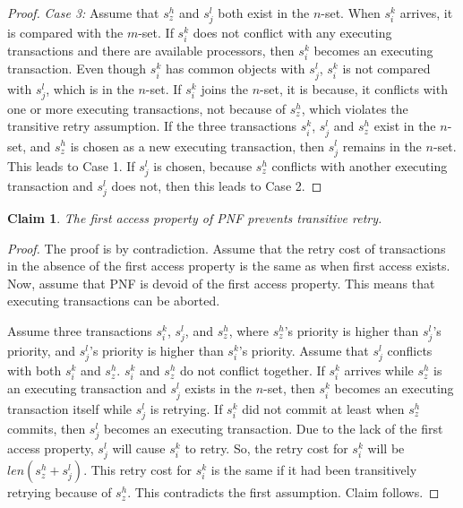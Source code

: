 \documentclass[a4paper,english]{article}
\newtheorem{clm}{Claim}
\newtheorem{proof}{Proof}
\begin{document}
\begin{proof}
\textit{Case 3:} Assume that $s_{z}^{h}$ and $s_{j}^{l}$ both exist in the $n$-set.
When $s_{i}^{k}$ arrives, it is compared with the $m$-set. If $s_{i}^{k}$ does not conflict with any executing transactions and there are available processors, then $s_{i}^{k}$ becomes an executing transaction. 
Even though $s_{i}^{k}$ has common objects with $s_{j}^{l}$, $s_{i}^{k}$ is not compared with $s_{j}^{l}$, which is in the $n$-set. If $s_{i}^{k}$ joins the $n$-set, it is because, it conflicts with one or more executing transactions, not because of $s_{z}^{h}$, which violates the transitive retry assumption.
If the three transactions $s_i^k$, $s_j^l$ and $s_z^h$ exist in the $n$-set, and  $s_{z}^{h}$ is chosen as a new executing transaction, then $s_{j}^{l}$ remains in the $n$-set. This leads to
Case 1. If $s_{j}^{l}$ is chosen, because $s_{z}^{h}$ conflicts
with another executing transaction and $s_{j}^{l}$ does not, then
this leads to Case 2. 
%
\end{proof}


\begin{clm}\label{first-access}
The first access property of PNF prevents transitive retry.
\end{clm}
\begin{proof}\normalfont
The proof is by contradiction. Assume that the retry cost of transactions
in the absence of the first access property is the same as when first access  exists. Now, assume that PNF is devoid of the first access property.  This means that executing transactions can be aborted. 

Assume three transactions $s_{i}^{k}$, $s_{j}^{l}$, and $s_{z}^{h}$, where $s_{z}^{h}$'s priority is higher than $s_{j}^{l}$'s priority, and $s_j^l$'s priority is higher than $s_{i}^{k}$'s priority. Assume that $s_{j}^{l}$ conflicts with both $s_{i}^{k}$ and $s_{z}^{h}$. 
$s_{i}^{k}$ and $s_{z}^{h}$ do not conflict together. If $s_{i}^{k}$
arrives while $s_{z}^{h}$ is an executing transaction and $s_{j}^{l}$
exists in the $n$-set, then $s_{i}^{k}$ becomes an executing transaction itself while $s_{j}^{l}$ is retrying. If $s_{i}^{k}$ did not commit at least when $s_{z}^{h}$ commits, then $s_{j}^{l}$ becomes an executing transaction. 
Due to the lack of the first access property, $s_{j}^{l}$ will cause $s_{i}^{k}$ to retry. So, the retry cost for $s_{i}^{k}$ will be $len(s_{z}^{h}+s_{j}^{l})$. This
retry cost for $s_{i}^{k}$ is the same if it had been transitively
retrying because of $s_{z}^{h}$. 
This contradicts the first
assumption. Claim follows.
\end{proof}
\end{document}

